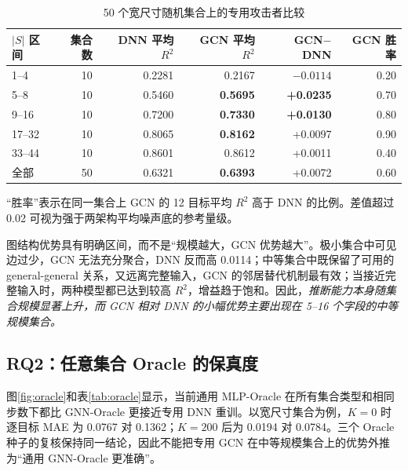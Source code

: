 \documentclass[UTF8,a4paper,zihao=5,fontset=fandol]{ctexart}
\newcommand{\Rtwo}{R^2}
\begin{document}
\begin{table}[H]
  \centering
  \caption{50 个宽尺寸随机集合上的专用攻击者比较}
  \label{tab:attacker}
  \begin{threeparttable}
  \begin{tabular}{@{}lrrrrr@{}}
    \toprule
    $|S|$ 区间 & 集合数 & DNN 平均 $\Rtwo$ & GCN 平均 $\Rtwo$
    & GCN$-$DNN & GCN 胜率\\
    \midrule
    1--4   & 10 & 0.2281 & 0.2167 & $-0.0114$ & 0.20\\
    5--8   & 10 & 0.5460 & \textbf{0.5695} & \textbf{+0.0235} & 0.70\\
    9--16  & 10 & 0.7200 & \textbf{0.7330} & \textbf{+0.0130} & 0.80\\
    17--32 & 10 & 0.8065 & \textbf{0.8162} & +0.0097 & 0.90\\
    33--44 & 10 & 0.8601 & 0.8612 & +0.0011 & 0.40\\
    \midrule
    全部   & 50 & 0.6321 & \textbf{0.6393} & +0.0072 & 0.60\\
    \bottomrule
  \end{tabular}
  \begin{tablenotes}\footnotesize
    \item “胜率”表示在同一集合上 GCN 的 12 目标平均 $\Rtwo$ 高于 DNN 的比例。差值超过 0.02 可视为强于两架构平均噪声底的参考量级。
  \end{tablenotes}
  \end{threeparttable}
\end{table}

图结构优势具有明确区间，而不是“规模越大，GCN 优势越大”。极小集合中可见边过少，GCN 无法充分聚合，DNN 反而高 0.0114；中等集合中既保留了可用的 general-general 关系，又远离完整输入，GCN 的邻居替代机制最有效；当接近完整输入时，两种模型都已达到较高 $\Rtwo$，增益趋于饱和。因此，\emph{推断能力本身随集合规模显著上升，而 GCN 相对 DNN 的小幅优势主要出现在 5--16 个字段的中等规模集合。}

\subsection{RQ2：任意集合 Oracle 的保真度}

图\ref{fig:oracle}和表\ref{tab:oracle}显示，当前通用 MLP-Oracle 在所有集合类型和相同步数下都比 GNN-Oracle 更接近专用 DNN 重训。以宽尺寸集合为例，$K=0$ 时逐目标 MAE 为 0.0767 对 0.1362；$K=200$ 后为 0.0194 对 0.0784。三个 Oracle 种子的复核保持同一结论，因此不能把专用 GCN 在中等规模集合上的优势外推为“通用 GNN-Oracle 更准确”。
\end{document}
